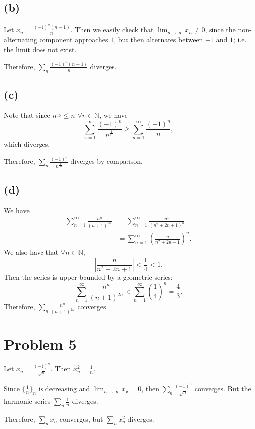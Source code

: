 \documentclass{article}
\begin{document}
\subsection*{(b)}
Let $x_n = \frac{(-1)^n(n-1)}{n}$. Then we easily check that $\lim_{n\to\infty}x_n \neq 0$, since the non-alternating component approaches $1$, but then alternates between $-1$ and $1$; i.e. the limit does not exist. 

Therefore, $\sum_n  \frac{(-1)^n(n-1)}{n}$ diverges.

\subsection*{(c)}
Note that since $n^{\frac{1}{10}} \leq n$ $\forall n \in \mathbb{N}$, we have
\begin{equation}
	\sum_{n=1}^{\infty} \frac{(-1)^n}{n^{\frac{1}{10}}} \geq \sum_{n=1}^{\infty} \frac{(-1)^n}{n},
\end{equation}
which diverges.

Therefore, $\sum_n \frac{(-1)^n}{n^{\frac{1}{10}}}$ diverges by comparison.

\subsection*{(d)}
We have
\begin{align}
	\sum_{n=1}^{\infty} \frac{n^n}{(n+1)^{2n}} &= \sum_{n=1}^{\infty} \frac{n^n}{(n^2 + 2n + 1)^n} \\
	&= \sum_{n=1}^{\infty}\left(\frac{n}{n^2 + 2n + 1}\right)^n.
\end{align}
We also have that $\forall n \in \mathbb{N}$,
\begin{equation}
	\left|\frac{n}{n^2 + 2n + 1}\right| < \frac{1}{4} < 1.
\end{equation}
Then the series is upper bounded by a geometric series:
\begin{equation}
	\sum_{n=1}^{\infty} \frac{n^n}{(n+1)^{2n}} < \sum_{n=1}^{\infty} \left(\frac{1}{4}\right)^n = \frac{4}{3}.
\end{equation}
Therefore, $\sum_n \frac{n^n}{(n+1)^{2n}}$ converges.
\section*{Problem 5}
Let $x_n = \frac{(-1)^n}{\sqrt{n}}$. Then $x_n^2 = \frac{1}{n}$. 

Since $\{\frac{1}{n}\}_n$ is decreasing and $\lim_{n\to\infty} x_n = 0$, then $\sum_n \frac{(-1)^n}{\sqrt{n}}$ converges. But the harmonic series $\sum_n \frac{1}{n}$ diverges.

Therefore, $\sum_n x_n$ converges, but $\sum_n x_n^2$ diverges.
\end{document}
